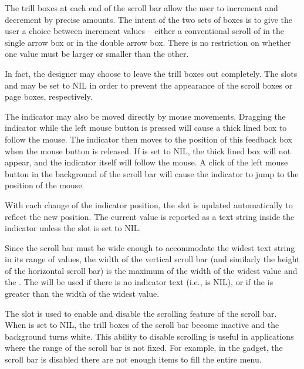 The trill boxes at each end of the scroll bar allow the user to
increment and decrement  by precise amounts.  The intent of
the two sets of boxes is to give the user a choice between increment
values -- either a conventional scroll of  in the single
arrow box or  in the double arrow box.  There is no
restriction on whether one value must be larger or smaller than the
other.
 

In fact, the designer may choose to leave the trill boxes out
completely.  The slots  and  may be
set to NIL in order to prevent the appearance of the scroll boxes or
page boxes, respectively.
 

The indicator may also be moved directly by mouse movements.  Dragging
the indicator while the left mouse button is pressed will cause a
thick lined box to follow the mouse.  The indicator then moves to the
position of this feedback box when the mouse button is released.  If
 is set to NIL, the thick lined box will not
appear, and the indicator itself will follow the mouse.  A click of
the left mouse button in the background of the scroll bar will cause
the indicator to jump to the position of the mouse.

With each change of the indicator position, the  slot is
updated automatically to reflect the new position.  The current value
is reported as a text string inside the indicator unless the slot
 is set to NIL.

Since the scroll bar must be wide enough to accommodate the widest
text string in its range of values, the width of the vertical scroll
bar (and similarly the height of the horizontal scroll bar) is the
maximum of the width of the widest value and the .  The
 will be used if there is no indicator text (i.e.,
 is NIL), or if the  is greater
than the width of the widest value.

The slot  is used to enable and disable the scrolling
feature of the scroll bar.  When  is set to NIL, the
trill boxes of the scroll bar become inactive and the background turns
white.  This ability to disable scrolling is useful in applications
where the range of the scroll bar is not fixed.  For example, in the
 gadget, the scroll bar is disabled there are not
enough items to fill the entire menu.

